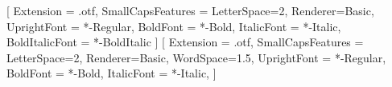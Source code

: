

\newcommand\tcap{}
\renewenvironment{longtable}{\begin{table}\begin{tabular}}{\end{tabular}\caption{\tcap}\end{table}}
\renewcommand{\endhead}{}
\renewcommand{\toprule}[2]{\specialrule{\heavyrulewidth}{\abovetopsep}{\belowrulesep}}
\renewcommand{\midrule}[2]{\specialrule{\lightrulewidth}{\aboverulesep}{\belowrulesep}}
\renewcommand{\bottomrule}[2]{\specialrule{\heavyrulewidth}{\aboverulesep}{\belowbottomsep}}

\usepackage{fvextra}

\usepackage{fontspec,unicode-math}

\setmainfont{LibertinusSerif}[
    Extension = .otf,
    SmallCapsFeatures = {LetterSpace=2, Renderer=Basic},
    UprightFont    = *-Regular,
    BoldFont       = *-Bold,
    ItalicFont     = *-Italic,
    BoldItalicFont = *-BoldItalic
]
\setsansfont{LibertinusSans}[
    Extension = .otf,
    SmallCapsFeatures = {LetterSpace=2, Renderer=Basic, WordSpace={1.5}},
    UprightFont    = *-Regular,
    BoldFont       = *-Bold,
    ItalicFont     = *-Italic,
]
\setmonofont[Scale=MatchLowercase]{FiraMono-Regular.otf}

\setlength{\columnsep}{0.25in}


\makeatletter
\def\@maketitle{
    \raggedright
    {\LARGE \bfseries \@title}\\[2ex]
    {\Large \@author}\\[1ex]
    {\Large \@date}\\[8ex]
}
\makeatother


\usepackage{titlesec}

\titleformat{\section}{\normalsize\bfseries\raggedright\scshape\sffamily\MakeUppercase}{\thesection}{1em}{}
\titleformat{\subsection}{\sffamily\raggedright\bfseries}{\thesubsection}{.6em}{}
\titleformat{\subsubsection}{\normalsize\sffamily\itshape}{\thesubsubsection}{.6em}{}

